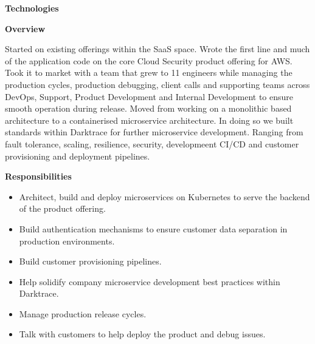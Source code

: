 \documentclass[10pt,a4paper]{altacv}
\begin{document}
\divider
\textbf{Technologies}

\divider


\textbf{Overview}

Started on existing offerings within the SaaS space. Wrote the first line and much of the application code on the core Cloud Security product offering for AWS. Took it to market with a team that grew to 11 engineers while managing the production cycles, production debugging, client calls and supporting teams across DevOps, Support, Product Development and Internal Development to ensure smooth operation during release.
\newline
\newline
Moved from working on a monolithic based architecture to a containerised microservice architecture. In doing so we built standards within Darktrace for further microservice development. Ranging from fault tolerance, scaling, resilience, security, developmeent CI/CD and customer provisioning and deployment pipelines.

\divider
\textbf{Responsibilities}

\begin{itemize}
\item Architect, build and deploy microservices on Kubernetes to serve the backend of the product offering.
\item Build authentication mechanisms to ensure customer data separation in production environments.
\item Build customer provisioning pipelines.
\item Help solidify company microservice development best practices within Darktrace.
\item Manage production release cycles.
\item Talk with customers to help deploy the product and debug issues.
\end{itemize}
\divider
  
\end{document}

